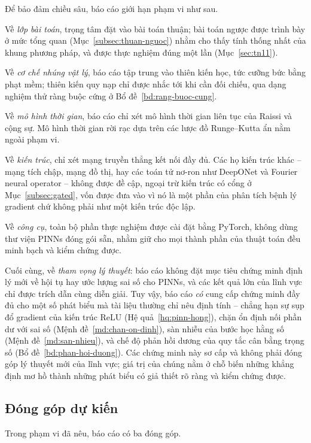 Để bảo đảm chiều sâu, báo cáo giới hạn phạm vi như sau.
 
Về \emph{lớp bài toán}, trọng tâm đặt vào bài toán thuận; bài toán ngược được
trình bày ở mức tổng quan (Mục~\ref{subsec:thuan-nguoc}) nhằm cho thấy tính thống
nhất của khung phương pháp, và được thực nghiệm đúng một lần
(Mục~\ref{sec:tn11}).
 
Về \emph{cơ chế nhúng vật lý}, báo cáo tập trung vào thiên kiến học, tức cưỡng
bức bằng phạt mềm; thiên kiến quy nạp chỉ được nhắc tới khi cần đối chiếu, qua
dạng nghiệm thử ràng buộc cứng ở Bổ đề~\ref{bd:rang-buoc-cung}.
 
Về \emph{mô hình thời gian}, báo cáo chỉ xét mô hình thời gian liên tục của
Raissi và cộng sự. Mô hình thời gian rời rạc dựa trên các lược đồ Runge--Kutta ẩn
nằm ngoài phạm vi.
 
Về \emph{kiến trúc}, chỉ xét mạng truyền thẳng kết nối đầy đủ. Các họ kiến trúc
khác -- mạng tích chập, mạng đồ thị, hay các toán tử nơ-ron như DeepONet và Fourier
neural operator -- không được đề cập, ngoại trừ kiến trúc có cổng ở
Mục~\ref{subsec:gated}, vốn được đưa vào vì nó là một phần của phân tích bệnh lý
gradient chứ không phải như một kiến trúc độc lập.
 
Về \emph{công cụ}, toàn bộ phần thực nghiệm được cài đặt bằng PyTorch, không dùng
thư viện PINNs đóng gói sẵn, nhằm giữ cho mọi thành phần của thuật toán đều minh
bạch và kiểm chứng được.
 
Cuối cùng, về \emph{tham vọng lý thuyết}: báo cáo không đặt mục tiêu chứng minh
định lý mới về hội tụ hay ước lượng sai số cho PINNs, và các kết quả lớn của lĩnh
vực chỉ được trích dẫn cùng diễn giải. Tuy vậy, báo cáo \emph{có} cung cấp chứng
minh đầy đủ cho một số phát biểu mà tài liệu thường chỉ nêu định tính -- chẳng hạn
sự sụp đổ gradient của kiến trúc ReLU (Hệ quả~\ref{hq:pinn-hong}), chặn ổn định
nối phần dư với sai số (Mệnh đề~\ref{md:chan-on-dinh}), sàn nhiễu của bước học
hằng số (Mệnh đề~\ref{md:san-nhieu}), và chế độ phản hồi dương của quy tắc cân
bằng trọng số (Bổ đề~\ref{bd:phan-hoi-duong}). Các chứng minh này sơ cấp và không
phải đóng góp lý thuyết mới của lĩnh vực; giá trị của chúng nằm ở chỗ biến những
khẳng định mơ hồ thành những phát biểu có giả thiết rõ ràng và kiểm chứng được.
 
\subsection{Đóng góp dự kiến}
 
Trong phạm vi đã nêu, báo cáo có ba đóng góp.
 
